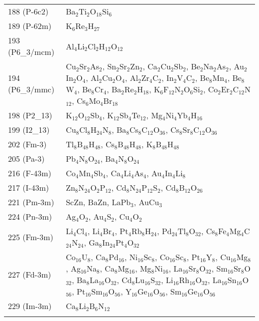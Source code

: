 {\begin{longtable}{p{7.315em}|p{40em}}
    188 (P-6c2) & Ba$_{2}$Ti$_{2}$O$_{18}$Si$_{6}$ \\
    189 (P-62m) & K$_{6}$Re$_{3}$H$_{27}$ \\
    193 (P6\_3/mcm) & Al$_{4}$Li$_{2}$Cl$_{2}$H$_{12}$O$_{12}$ \\
    194 (P6\_3/mmc) & Cu$_{2}$Sr$_{2}$As$_{2}$, Sn$_{2}$Sr$_{2}$Zn$_{2}$, Ca$_{2}$Cu$_{2}$Sb$_{2}$, Be$_{2}$Na$_{2}$As$_{2}$, Au$_{2}$In$_{2}$O$_{4}$, Al$_{2}$Cu$_{2}$O$_{4}$, Al$_{2}$Zr$_{4}$C$_{2}$, In$_{2}$V$_{4}$C$_{2}$, Be$_{8}$Mn$_{4}$, Be$_{8}$W$_{4}$, Be$_{8}$Cr$_{4}$, Ba$_{2}$Re$_{2}$H$_{18}$, K$_{6}$F$_{12}$N$_{2}$O$_{6}$Si$_{2}$, Co$_{2}$Er$_{2}$C$_{12}$N$_{12}$, Cs$_{6}$Mo$_{4}$Br$_{18}$ \\
    198 (P2\_13) & K$_{12}$O$_{12}$Sb$_{4}$, K$_{12}$Sb$_{4}$Te$_{12}$, Mg$_{4}$Ni$_{4}$Yb$_{4}$H$_{16}$ \\
    199 (I2\_13) & Cu$_{8}$Cl$_{8}$H$_{24}$N$_{8}$, Ba$_{8}$Cs$_{8}$C$_{12}$O$_{36}$, Cs$_{8}$Sr$_{8}$C$_{12}$O$_{36}$ \\
    202 (Fm-3) & Tl$_{8}$B$_{48}$H$_{48}$, Cs$_{8}$B$_{48}$H$_{48}$, K$_{8}$B$_{48}$H$_{48}$ \\
    205 (Pa-3) & Pb$_{4}$N$_{8}$O$_{24}$, Ba$_{4}$N$_{8}$O$_{24}$ \\
    216 (F-43m) & Co$_{4}$Mn$_{4}$Sb$_{4}$, Ca$_{4}$Li$_{4}$As$_{4}$, Au$_{4}$In$_{4}$Li$_{8}$ \\
    217 (I-43m) & Zn$_{8}$N$_{24}$O$_{2}$P$_{12}$, Cd$_{8}$N$_{24}$P$_{12}$S$_{2}$, Cd$_{8}$B$_{12}$O$_{26}$ \\
    221 (Pm-3m) & ScZn, BaZn, LaPb$_{3}$, AuCu$_{3}$ \\
    224 (Pn-3m) & Ag$_{4}$O$_{2}$, Au$_{4}$S$_{2}$, Cu$_{4}$O$_{2}$ \\
    225 (Fm-3m) & Li$_{4}$Cl$_{4}$, Li$_{4}$Br$_{4}$, Pt$_{4}$Rb$_{8}$H$_{24}$, Pd$_{24}$Tl$_{8}$O$_{32}$, Cs$_{8}$Fe$_{4}$Mg$_{4}$C$_{24}$N$_{24}$, Ga$_{8}$In$_{24}$Pt$_{4}$O$_{32}$ \\
    227 (Fd-3m) & Co$_{16}$U$_{8}$, Ca$_{8}$Pd$_{16}$, Ni$_{16}$Sc$_{8}$, Co$_{16}$Sc$_{8}$, Pt$_{16}$Y$_{8}$, Cu$_{16}$Mg$_{8}$, Ag$_{16}$Na$_{8}$, Ca$_{8}$Mg$_{16}$, Mg$_{8}$Ni$_{16}$, La$_{16}$Sr$_{8}$O$_{32}$, Sm$_{16}$Sr$_{8}$O$_{32}$, Ba$_{8}$La$_{16}$O$_{32}$, Cd$_{8}$Lu$_{16}$S$_{32}$, Li$_{16}$Rh$_{16}$O$_{32}$, La$_{16}$Sn$_{16}$O$_{56}$, Pt$_{16}$Sm$_{16}$O$_{56}$, Y$_{16}$Ge$_{16}$O$_{56}$, Sm$_{16}$Ge$_{16}$O$_{56}$ \\
    229 (Im-3m) & Ca$_{8}$Li$_{2}$B$_{6}$N$_{12}$ \\
    \label{clean}\\
\end{longtable}
}
